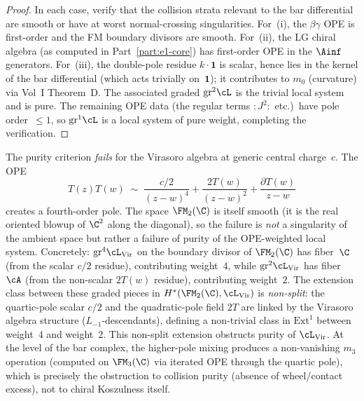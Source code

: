 \begin{proof}
In each case, verify that the collision strata relevant to the bar
differential are smooth or have at worst normal-crossing
singularities. For~(i), the $\beta\gamma$ OPE is first-order and
the FM boundary divisors are smooth. For~(ii), the LG chiral
algebra (as computed in Part~\ref{part:e1-core}) has first-order OPE in the
$\Ainf$ generators. For~(iii), the double-pole residue $k \cdot \mathbf{1}$ is scalar,
hence lies in the kernel of the bar differential (which acts
trivially on~$\mathbf{1}$); it contributes to $m_0$ (curvature)
via Vol~I Theorem~D. The associated graded $\mathrm{gr}^2\cL$
is the trivial local system and is pure. The remaining OPE data
(the regular terms $:J^2:$ etc.)\ have pole order~$\leq 1$,
so $\mathrm{gr}^1\cL$ is a local system of pure weight, completing
the verification.
\end{proof}

\begin{proposition}
\label{prop:purity-failure-virasoro}
The purity criterion \emph{fails} for the Virasoro algebra at
generic central charge~$c$. The OPE
\[
T(z)T(w) \;\sim\; \frac{c/2}{(z-w)^4} +
\frac{2T(w)}{(z-w)^2} + \frac{\partial T(w)}{z-w}
\]
creates a fourth-order pole. The space $\FM_2(\C)$ is itself
smooth (it is the real oriented blowup of $\C^2$ along the
diagonal), so the failure is \emph{not} a singularity of the
ambient space but rather a failure of purity of the OPE-weighted
local system. Concretely: $\mathrm{gr}^4\cL_{\mathrm{Vir}}$
on the boundary divisor of $\FM_2(\C)$ has fiber~$\C$
(from the scalar $c/2$ residue), contributing weight~$4$, while
$\mathrm{gr}^2\cL_{\mathrm{Vir}}$ has fiber~$\cA$ (from the
non-scalar $2T(w)$ residue), contributing weight~$2$. The
extension class between these graded pieces in
$H^*(\FM_2(\C), \cL_{\mathrm{Vir}})$ is \emph{non-split}: the
quartic-pole scalar $c/2$ and the quadratic-pole field $2T$
are linked by the Virasoro algebra structure ($L_{-1}$-descendants),
defining a non-trivial class in $\mathrm{Ext}^1$ between weight~$4$
and weight~$2$. This non-split extension obstructs purity of
$\cL_{\mathrm{Vir}}$. At the level of the bar complex,
the higher-pole mixing produces a non-vanishing $m_3$ operation
(computed on $\FM_3(\C)$ via iterated OPE through the quartic
pole), which is precisely the obstruction to collision purity
(absence of wheel/contact excess), not to chiral Koszulness itself.
\end{proposition}

